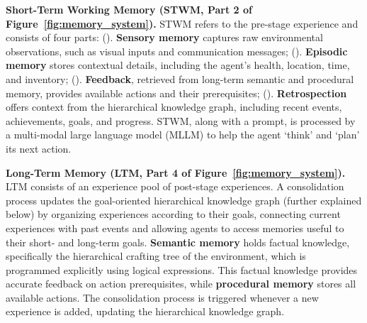 \textbf{Short-Term Working Memory (STWM, Part 2 of Figure~\ref{fig:memory_system}).} STWM refers to the pre-stage experience and consists of four parts: (). \textbf{Sensory memory} captures raw environmental observations, such as visual inputs and communication messages; (). \textbf{Episodic memory} stores contextual details, including the agent's health, location, time, and inventory; (). \textbf{Feedback}, retrieved from long-term semantic and procedural memory, provides available actions and their prerequisites; (). \textbf{Retrospection} offers context from the hierarchical knowledge graph, including recent events, achievements, goals, and progress. STWM, along with a prompt, is processed by a multi-modal large language model (MLLM) to help the agent `think' and `plan' its next action.


\textbf{Long-Term Memory (LTM, Part 4 of Figure~\ref{fig:memory_system}).} LTM consists of an experience pool of post-stage experiences. A consolidation process updates the goal-oriented hierarchical knowledge graph (further explained below) by organizing experiences according to their goals, connecting current experiences with past events and allowing agents to access memories useful to their short- and long-term goals.
\textbf{Semantic memory} holds factual knowledge, specifically the hierarchical crafting tree of the environment, which is programmed explicitly using logical expressions. This factual knowledge provides accurate feedback on action prerequisites, 
while \textbf{procedural memory} stores all available actions. The consolidation process is triggered whenever a new experience is added, updating the hierarchical knowledge graph.

